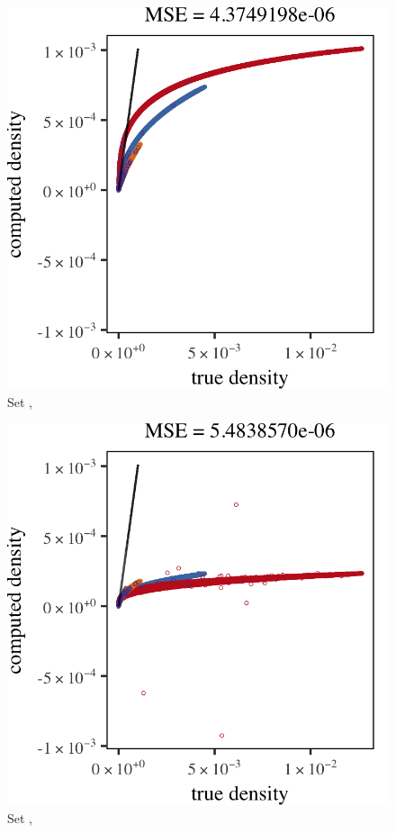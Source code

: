 \begin{subfigure}{0.23\textwidth}
	\centering
	\includegraphics[keepaspectratio=true, width=\textwidth, height=0.23\textheight]{result/img/all/results_ferdosi_3_120000_mbe_silverman.png}
	\caption{Set \ferdosiThree, \mbe}
	\label{fig:4:results:mbe:ferdosi3}
\end{subfigure}
\begin{subfigure}{0.23\textwidth}
	\centering
	\includegraphics[keepaspectratio=true, width=\textwidth, height=0.23\textheight]{result/img/all/results_ferdosi_3_120000_sambe_silverman}
	\caption{Set \ferdosiThree, \sambe}
	\label{fig:4:simulated:datasets:sambe:ferdosi3}
\end{subfigure}
